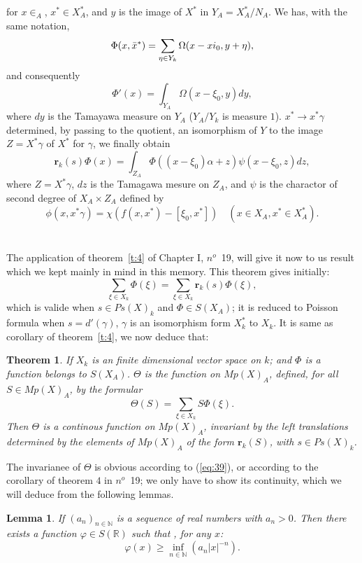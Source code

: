 \documentclass[12pt]{amsart}
\newtheorem{lemma}{Lemma}
\newtheorem{thm}{Theorem}
\def\bR{{\mathbb{R}}}
\def\bN{{\mathbb{N}}}
\def\br{{\mathbf{r}}}
\begin{document}
for $x\in _A$, $x^*\in X_A^*$, and $y$ is the image of $X^*$ in $Y_A=X^*_A/N_A$.
We has, with the same notation,
\[
\Phi(x,{\bar{x}}^*)=\sum_{\eta\in Y_k}\Omega(x-xi_0,y+\eta),
\]
and consequently
\[
\Phi'(x) = \int_{Y_A}\Omega(x-\xi_0,y)dy,
\]
where $dy$ is the Tamayawa measure on $Y_A$ ($Y_A/Y_k$ is measure $1$).
$x^*\to x^*\gamma$ determined, by passing to the quotient, an isomorphism of
$Y$ to the image $Z=X^*\gamma$ of $X^*$ for $\gamma$, we finally obtain
\[
\br_k(s)\Phi(x) = \int_{Z_A}\Phi((x-\xi_0)\alpha+ z)\psi(x-\xi_0, z) dz,
\]
where $Z=X^*\gamma$, $dz$ is the Tamagawa mesure on $Z_A$, and $\psi$ is 
the charactor of second degree of $X_A\times Z_A$ defined by 
\[
\phi(x,x^*\gamma) = \chi(f(x,x^*)-[\xi_0,x^*])
\quad (x\in X_A,x^*\in X^*_A).
\]

\section{}
The application of theorem~\ref{t:4} of Chapter I, $n^o$~19, 
will give it now to us 
result which we kept mainly in mind in this memory.  
This theorem gives initially: 
\begin{equation}\label{eq:39}
\sum_{\xi\in X_k} \Phi(\xi)= \sum_{\xi\in X_k}\br_k(s)\Phi(\xi),
\end{equation}
which is valide when $s\in Ps(X)_k$ and $\Phi \in S(X_A)$;
it is reduced to Poisson formula when $s =d'(\gamma)$, $\gamma$ is an
isomorphism form $X^*_k$ to $X_k$. 
It is same as corollary of theorem~\ref{t:4}, we now deduce that:
\begin{thm}\label{t:6}
If $X_k$ is an finite dimensional vector space on $k$; and $\Phi$ is 
a function belongs to $S(X_A)$. $\Theta$ is the function on $Mp(X)_A$, defined,
for all $S\in Mp(X)_A$, by the formular
\[
\Theta(S) = \sum_{\xi\in X_k} S\Phi(\xi).
\]
Then $\Theta$ is a continous function on $Mp(X)_A$, 
invariant by the left translations determined by 
the elements of $Mp(X)_A$ of the form $\br_k(S)$, 
with $s\in Ps(X)_k$.
\end{thm} 

The invarianee of $\Theta$ is obvious according to (\ref{eq:39}),
or according to the corollary of theorem $4$ in $n^o$~19; 
we only have to show its continuity,
which we will deduce from the following lemmas. 

\begin{lemma}\label{l:4}
If $(a_n)_{n\in \bN}$ is a sequence of real numbers with $a_n>0$. 
Then there exists a function $\varphi\in S(\bR)$ such that , for any $x$:
\[
\varphi(x) \geq \inf_{n\in \bN} (a_n|x|^{-n}).
\]
\end{lemma}
\end{document}
